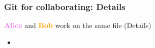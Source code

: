 \documentclass[xcolor=x11names,compress]{beamer}
\renewcommand{\(}{\begin{columns}}
\renewcommand{\)}{\end{columns}}
\newcommand{\<}[1]{\begin{column}{#1}}
\renewcommand{\>}{\end{column}}
\begin{document}
\begin{frame}
\frametitle{Git for collaborating:  Details}
\textcolor{violet}{\textbf{Alice}} and \textcolor{orange}{\textbf{Bob}} work on the same file (Details)
\pause

\begin{itemize}
\item[]

\end{itemize}
\end{frame}
\end{document}

